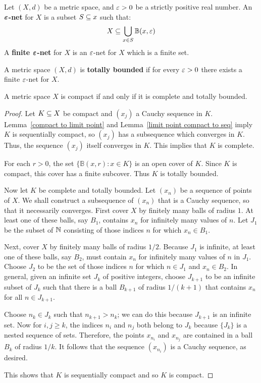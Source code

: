 \begin{definition}
Let $(X,d)$ be a metric space, and $\varepsilon>0$ be a strictly positive real number. An \textbf{$\bm{\varepsilon}$-net} for $X$ is a subset $S\subseteq x$ such that:
\[X\subseteq\bigcup_{x\in S}\mathbb{B}(x,\varepsilon)\]
A \textbf{finite $\bm{\varepsilon}$-net} for $X$ is an $\varepsilon$-net for $X$ which is a finite set.
\end{definition}
\begin{definition}
A metric space $(X,d)$ is \textbf{totally bounded} if for every $\varepsilon>0$ there exists a finite $\varepsilon$-net for $X$.
\end{definition}
\begin{theorem}
A metric space $X$ is compact if and only if it is complete and totally bounded.
\end{theorem}
\begin{proof}
Let $K\subseteq X$ be compact and $(x_j)$ a Cauchy sequence in $K$. Lemma~\ref{compact to limit point} and Lemma~\ref{limit point compact to seq} imply $K$ is
sequentially compact, so $(x_j)$ has a subsequence which converges in $K$. Thus, the sequence $(x_j)$ itself converges in $K$. This implies that $K$ is complete.\par
For each $r>0$, the set $\{\mathbb{B}(x,r):x\in K\}$ is an open cover of $K$. Since $K$ is compact, this cover has a finite subcover. Thus $K$ is totally bounded.\par
Now let $K$ be complete and totally bounded. Let $(x_n)$ be a sequence of points of $X$. We shall construct a subsequence of $(x_n)$ that is a Cauchy sequence, so that it necessarily converges. First cover $X$ by finitely many balls of radius $1$. At least one of these balls, say $B_1$, contains $x_n$ for infinitely many values of $n$. Let $J_1$ be the subset of $\mathbb{N}$ consisting of those indices $n$ for which $x_n\in B_1$.\par
Next, cover $X$ by finitely many balls of radius $1/2$. Because $J_1$ is infinite, at
least one of these balls, say $B_2$, must contain $x_n$ for infinitely many values of $n$ in $J_1$. Choose $J_2$ to be the set of those indices $n$ for which $n\in J_1$ and $x_n\in B_2$. In general, given an infinite set $J_k$ of positive integers, choose $J_{k+1}$ to be an infinite subset of $J_k$ such that there is a ball $B_{k+1}$ of radius $1/(k+1)$ that contains $x_n$ for all $n\in J_{k+1}$.\par
Choose $n_k\in J_k$ such that $n_{k+1}>n_k$; we can do this because $J_{k+1}$ is an infinite set. Now for $i,j\geq k$, the indices $n_i$ and $n_j$ both belong to $J_k$ because $\{J_k\}$ is a nested sequence of sets. Therefore, the points $x_{n_i}$ and $x_{n_j}$ are contained in a ball $B_k$ of radius $1/k$. It follows that the sequence $(x_{n_i})$ is a Cauchy sequence, as desired.\par
This shows that $K$ is sequentially compact and so $K$ is compact.
\end{proof}
